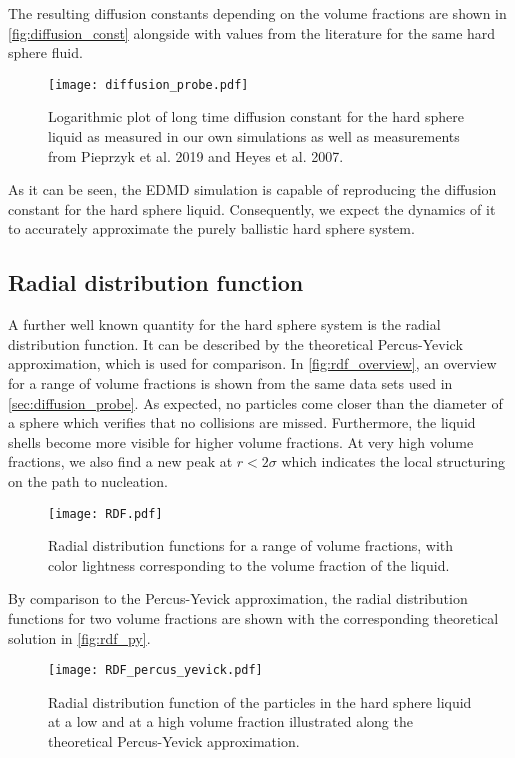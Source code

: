 The resulting diffusion constants depending on the volume fractions are shown in \autoref{fig:diffusion_const} alongside with values from the literature for the same hard sphere fluid.\\

\begin{figure}[h]
\centering
\texttt{[image: diffusion\_probe.pdf]}
\caption[Long time diffusion constant at varying volume fractions]{Logarithmic plot of long time diffusion constant for the hard sphere liquid as measured in our own simulations as well as measurements from Pieprzyk et al. 2019\cite{Pieprzyk2019} and Heyes et al. 2007\cite{Heyes2007}.}
\label{fig:diffusion_const}
\end{figure}

As it can be seen, the EDMD simulation is capable of reproducing the diffusion constant for the hard sphere liquid. Consequently, we expect the dynamics of it to accurately approximate the purely ballistic hard sphere system.
\FloatBarrier
\subsection{Radial distribution function}
\label{sec:RDF_prob}
A further well known quantity for the hard sphere system is the radial distribution function. It can be described by the theoretical Percus-Yevick approximation, which is used for comparison. In \autoref{fig:rdf_overview}, an overview for a range of volume fractions is shown from the same data sets used in \autoref{sec:diffusion_probe}. As expected, no particles come closer than the diameter of a sphere which verifies that no collisions are missed. Furthermore, the liquid shells become more visible for higher volume fractions. At very high volume fractions, we also find a new peak at $r < 2 \sigma$ which indicates the local structuring on the path to nucleation.
\begin{figure}[h]
\centering
\texttt{[image: RDF.pdf]}
\caption[Radial distribution functions at varying volume fractions]{Radial distribution functions for a range of volume fractions, with color lightness corresponding to the volume fraction of the liquid.}
\label{fig:rdf_overview}
\end{figure}
By comparison to the Percus-Yevick approximation, the radial distribution functions for two volume fractions are shown with the corresponding theoretical solution in \autoref{fig:rdf_py}.
\begin{figure}[h]
\centering
\texttt{[image: RDF\_percus\_yevick.pdf]}
\caption[Radial distribution function with Percus-Yevick approximation]{Radial distribution function of the particles in the hard sphere liquid at a low and at a high volume fraction illustrated along the theoretical Percus-Yevick approximation.}
\label{fig:rdf_py}
\end{figure}

